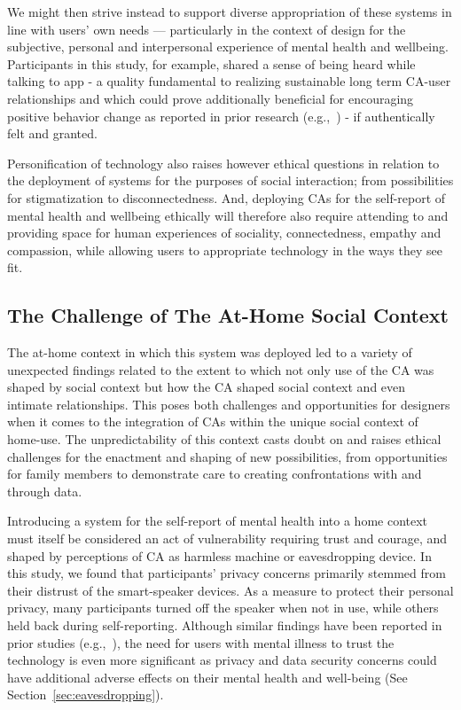         We might then strive instead to support diverse appropriation of these systems in line with users' own needs --- particularly in the context of design for the subjective, personal and interpersonal experience of mental health and wellbeing. Participants in this study, for example, shared a sense of being heard while talking to \acl{app} - a quality fundamental to realizing sustainable long term \ac{CA}-user relationships and which could prove additionally beneficial for encouraging positive behavior change as reported in prior research (e.g.,~\cite{thieme2015designing, bickmore2005establishing}) - if authentically felt and granted.
        
        Personification of technology also raises however ethical questions in relation to the deployment of systems for the purposes of social interaction; from possibilities for stigmatization to disconnectedness. And, deploying CAs for the self-report of mental health and wellbeing ethically will therefore also require attending to and providing space for human experiences of sociality, connectedness, empathy and compassion, while allowing users to appropriate technology in the ways they see fit.

    \subsection{The Challenge of The At-Home Social Context} %

        The at-home context in which this system was deployed led to a variety of unexpected findings related to the extent to which not only use of the \ac{CA} was shaped by social context but how the \ac{CA} shaped social context and even intimate relationships. This poses both challenges and opportunities for designers when it comes to the integration of CAs within the unique social context of home-use. The unpredictability of this context casts doubt on and raises ethical challenges for the enactment and shaping of new possibilities, from opportunities for family members to demonstrate care to creating confrontations with and through data.
        
        Introducing a system for the self-report of mental health into a home context must itself be considered an act of vulnerability requiring trust and courage, and shaped by perceptions of \ac{CA} as harmless machine or eavesdropping device. In this study, we found that participants' privacy concerns primarily stemmed from their distrust of the smart-speaker devices. As a measure to protect their personal privacy, many participants turned off the speaker when not in use, while others held back during self-reporting. Although similar findings have been reported in prior studies (e.g.,~\cite{pradhan2018accessibility, lau2018alexa}), the need for users with mental illness to trust the technology is even more significant as privacy and data security concerns could have additional adverse effects on their mental health and well-being (See Section~\ref{sec:eavesdropping}). 
        
